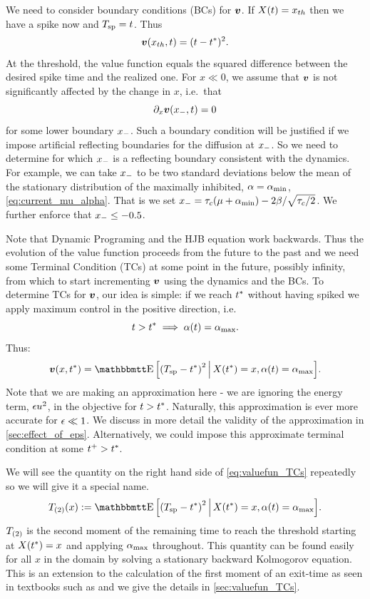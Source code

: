 \documentclass[12pt]{iopart}
\begin{document}
We need to consider boundary conditions (BCs) for ${ \boldsymbol{v} }$. If $X(t) = { x_{th} }$ then we
have a spike now and ${ T_{\textrm{sp} } } = t$. Thus $$ { \boldsymbol{v} }({ x_{th} },t) = (t-{ t^* })^2.$$ At the
threshold, the value function equals the squared difference between the desired
spike time and the realized one. For $x \ll 0$, we assume that ${ \boldsymbol{v} }$ is not
significantly affected by the change in $x$, i.e.\ that $$ {\partial}_x { \boldsymbol{v} }({ x_{-} }, t) =
0 $$ for some lower boundary ${ x_{-} }$. Such a boundary condition will be
justified if we impose artificial reflecting boundaries for the diffusion at
${ x_{-} }$. So we need to determine for which ${ x_{-} }$ is a reflecting boundary
consistent with the dynamics. For example, we can take ${ x_{-} }$ to be two
standard deviations below the mean of the stationary distribution of the
maximally inhibited, ${\alpha}={ {\alpha}_{\textrm{min}} }$, \cref{eq:current_mu_alpha}. That is we set
${ x_{-} } = { \tau_{c} }(\mu + { {\alpha}_{\textrm{min}} }) - 2 {\beta} / \sqrt{{ \tau_{c} }/2}$. We further enforce
that ${ x_{-} } \leq -0.5$.

Note that Dynamic Programing and the HJB equation work backwards. Thus the
evolution of the value function proceeds from the future to the past and we need
some Terminal Condition (TCs) at some point in the future, possibly infinity,
from which to start incrementing ${ \boldsymbol{v} }$ using the dynamics and the BCs. To
determine TCs for ${ \boldsymbol{v} }$, our idea is simple: if we reach ${ t^* }$ without having
spiked we apply maximum control in the positive direction, i.e.\ 
$$t>{ t^* } \implies {\alpha}(t) = { {\alpha}_{\textrm{max}} }.$$ Thus: \begin{equation}\v(x,\T) = \Exp
\Big[\trem^2 \,\Big|\, X(\T) = x, \a(t) = \amax \Big].
\label{eq:valuefun_TCs}
\end{equation}
Note that we are making an approximation here
- we are ignoring the energy term, ${\epsilon} u^2$, in the objective for
$t>{ t^* }$. Naturally, this approximation is ever more accurate for ${\epsilon} \ll 1$.
We discuss in more detail the validity of the approximation in
\cref{sec:effect_of_eps}.
Alternatively, we could impose this approximate terminal condition at some $t^+
> { t^* }$.

We will see the quantity on the right hand side of \cref{eq:valuefun_TCs}
repeatedly so we will give it a special name.
\begin{equation}
\Ttwo(x) := \Exp \Big[\trem^2 \,\Big|\, X(\T) = x, \a(t) = \amax \Big].
\label{eq:Trem_squared}
\end{equation}
${ {T}_{(2)} }$ is the second moment of the remaining time to reach the
threshold starting at $X({ t^* }) = x$ and applying ${ {\alpha}_{\textrm{max}} }$ throughout. This quantity
can be found easily for all $x$ in the domain by solving a stationary backward Kolmogorov
equation. This is an extension to the calculation of the first moment of an
exit-time as seen in textbooks such as \cite{Jacobs} and we give the
details in \ref{sec:valuefun_TCs}.
\end{document}
